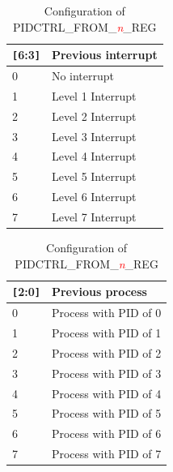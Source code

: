 \begin{table}[H]
    \centering
    \caption{Configuration of PIDCTRL\_FROM\_\textcolor{red}{\it{n}}\_REG}
    \label{table:PIDCTRL_FROM_n_REG}
    \begin{tabular}{|p{2cm}|p{5cm}|}
        \hline
        \rowcolor{lightgray}
        \verb+[+6:3\verb+]+ & Previous interrupt \\
        \hline
        0 & No interrupt \\
        \hline
        1 & Level 1 Interrupt \\
        \hline
        2 & Level 2 Interrupt \\
        \hline
        3 & Level 3 Interrupt \\
        \hline
        4 & Level 4 Interrupt \\
        \hline
        5 & Level 5 Interrupt \\
        \hline
        6 & Level 6 Interrupt \\
        \hline
        7 & Level 7 Interrupt \\
        \hline
    \end{tabular}
    \begin{tabular}{|p{2cm}|p{5cm}|}
        \hline
        \rowcolor{lightgray}
        \verb+[+2:0\verb+]+ & Previous process \\
        \hline
        0 & Process with PID of 0 \\
        \hline
        1 & Process with PID of 1 \\
        \hline
        2 & Process with PID of 2 \\
        \hline
        3 & Process with PID of 3 \\
        \hline
        4 & Process with PID of 4 \\
        \hline
        5 & Process with PID of 5 \\
        \hline
        6 & Process with PID of 6 \\
        \hline
        7 & Process with PID of 7 \\
        \hline
    \end{tabular}
\end{table}
